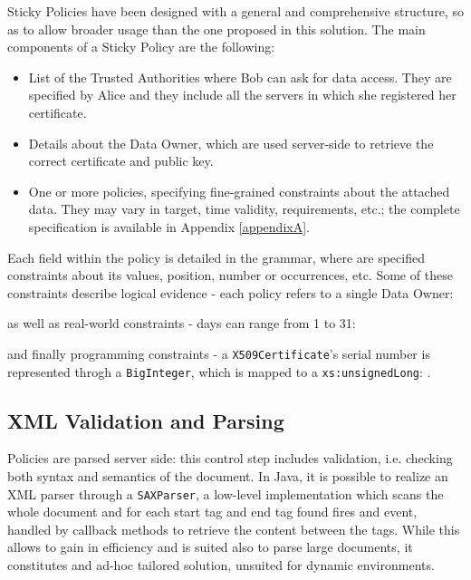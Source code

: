 Sticky Policies have been designed with a general and comprehensive structure, so as to allow broader usage than the one proposed in this solution. The main components of a Sticky Policy are the following:
\begin{itemize}
	\item List of the Trusted Authorities where Bob can ask for data access. They are specified by Alice and they include all the servers in which she registered her certificate.
	\item Details about the Data Owner, which are used server-side to retrieve the correct certificate and public key.
	\item One or more policies, specifying fine-grained constraints about the attached data. They may vary in target, time validity, requirements, etc.; the complete specification is available in Appendix \ref{appendixA}.
\end{itemize}

Each field within the policy is detailed in the grammar, where are specified constraints about its values, position, number or occurrences, etc. Some of these constraints describe logical evidence - each policy refers to a single Data Owner:

as well as real-world constraints - days can range from 1 to 31:

and finally programming constraints - a \texttt{X509Certificate}'s serial number is represented throgh a \texttt{BigInteger}, which is mapped to a \texttt{xs:unsignedLong}:
 .


\subsection{XML Validation and Parsing}
Policies are parsed server side: this control step includes validation, i.e. checking both syntax and semantics of the document. In Java, it is possible to realize an XML parser through a \texttt{SAXParser}, a low-level implementation which scans the whole document and for each start tag and end tag found fires and event, handled by callback methods to retrieve the content between the tags. While this allows to gain in efficiency and is suited also to parse large documents, it constitutes and ad-hoc tailored solution, unsuited for dynamic environments.


